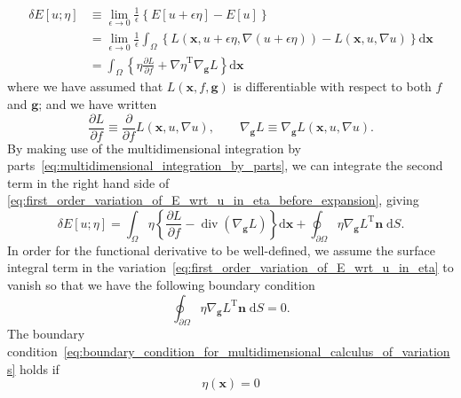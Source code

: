 \documentclass[12pt,a4paper]{article}
\begin{document}
\begin{align}
\delta E[u; \eta] &\equiv
\lim_{\epsilon \to 0} \frac{1}{\epsilon} \left\{ E[u + \epsilon\eta] - E[u] \right\}
\label{eq:first_order_variation_of_E_in_eta} \\
&= \lim_{\epsilon \to 0} \frac{1}{\epsilon}
\int_{\Omega} \left\{
L\left(\mathbf{x}, u + \epsilon\eta, \nabla (u + \epsilon\eta)\right) -
L\left(\mathbf{x}, u, \nabla u\right)
\right\} \mathrm{d}\mathbf{x} \\
&= \int_{\Omega} \left\{
\eta\frac{\partial L}{\partial f} +
{\nabla\eta}^{\operatorname{T}} \nabla_{\mathbf{g}} L
\right\} \mathrm{d}\mathbf{x}
\label{eq:first_order_variation_of_E_wrt_u_in_eta_before_expansion}
\end{align}
where we have assumed that $L(\mathbf{x}, f, \mathbf{g})$ is differentiable with respect to
both $f$ and $\mathbf{g}$; and we have written
\begin{equation}
\frac{\partial L}{\partial f} \equiv
\frac{\partial}{\partial f} L\left(\mathbf{x}, u, \nabla u\right) , \qquad
\nabla_{\mathbf{g}} L \equiv 
\nabla_{\mathbf{g}} L\left(\mathbf{x}, u, \nabla u\right) .
\end{equation}
By making use of
the multidimensional integration by parts~\eqref{eq:multidimensional_integration_by_parts},
we can integrate the second term in the right hand side of
\eqref{eq:first_order_variation_of_E_wrt_u_in_eta_before_expansion}, giving
\begin{equation}
\delta E[u; \eta] =
\int_{\Omega} \eta \left\{
\frac{\partial L}{ \partial f} - \operatorname{div}\left( \nabla_{\mathbf{g}} L \right)
\right\} \mathrm{d}\mathbf{x} +
\oint_{\partial\Omega} \eta {\nabla_{\mathbf{g}} L}^{\operatorname{T}} \mathbf{n} \; \mathrm{d}S .
\label{eq:first_order_variation_of_E_wrt_u_in_eta}
\end{equation}
In order for the functional derivative to be well-defined,
we assume the surface integral term in
the variation~\eqref{eq:first_order_variation_of_E_wrt_u_in_eta} to vanish so that
we have the following boundary condition
\begin{equation}
\oint_{\partial\Omega} \eta {\nabla_{\mathbf{g}} L}^{\operatorname{T}} \mathbf{n} \; \mathrm{d}S
= 0.
\label{eq:boundary_condition_for_multidimensional_calculus_of_variations}
\end{equation}
The boundary condition~\eqref{eq:boundary_condition_for_multidimensional_calculus_of_variations}
holds if
\begin{equation}
\eta(\mathbf{x}) = 0
\label{eq:fixed_boundary_condition_for_calculus_of_variations}
\end{equation}
\end{document}
